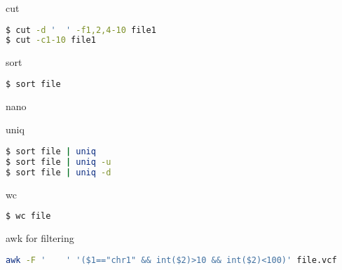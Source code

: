 \documentclass{beamer}
\begin{document}
\begin{frame}[fragile]
 \begin{center}
    \huge{cut}\\
    \end{center}
\begin{lstlisting}[language=bash]
$ cut -d '	' -f1,2,4-10 file1
$ cut -c1-10 file1
\end{lstlisting}
\end{frame}

\begin{frame}[fragile]
 \begin{center}
    \huge{sort}\\
    \end{center}
\begin{lstlisting}[language=bash]
$ sort file 
\end{lstlisting}
\end{frame}


\begin{frame}[fragile]
 \begin{center}
    \huge{nano}\\
    \end{center}
\end{frame}


\begin{frame}[fragile]
 \begin{center}
    \huge{uniq}\\
    \end{center}
\begin{lstlisting}[language=bash]
$ sort file | uniq
$ sort file | uniq -u
$ sort file | uniq -d
\end{lstlisting}
\end{frame}


\begin{frame}[fragile]
 \begin{center}
    \huge{wc}\\
    \end{center}
\begin{lstlisting}[language=bash]
$ wc file
\end{lstlisting}
\end{frame}


\begin{frame}[fragile]
 \begin{center}
    \huge{awk for filtering}\\
    \end{center}
\begin{lstlisting}[language=bash]
awk -F '	' '($1=="chr1" && int($2)>10 && int($2)<100)' file.vcf
\end{lstlisting}
\end{frame}
\end{document}
